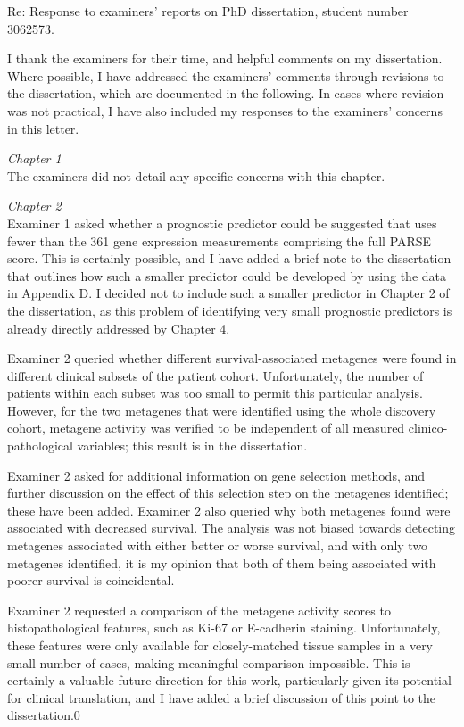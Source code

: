 \documentclass[a4paper,12pt,stdletter,sigleft]{newlfm}
\begin{document}
\begin{newlfm}

Re: Response to examiners' reports on PhD dissertation, student number 3062573.

I thank the examiners for their time, and helpful comments on my dissertation.  Where possible, I have addressed the examiners' comments through revisions to the dissertation, which are documented in the following.  In cases where revision was not practical, I have also included my responses to the examiners' concerns in this letter.

\emph{Chapter 1} \\
The examiners did not detail any specific concerns with this chapter.

\emph{Chapter 2} \\
Examiner 1 asked whether a prognostic predictor could be suggested that uses fewer than the 361 gene expression measurements comprising the full PARSE score.  This is certainly possible, and I have added a brief note to the dissertation that outlines how such a smaller predictor could be developed by using the data in Appendix D.  I decided not to include such a smaller predictor in Chapter 2 of the dissertation, as this problem of identifying very small prognostic predictors is already directly addressed by Chapter 4.

Examiner 2 queried whether different survival-associated metagenes were found in different clinical subsets of the patient cohort.  Unfortunately, the number of patients within each subset was too small to permit this particular analysis.  However, for the two metagenes that were identified using the whole discovery cohort, metagene activity was verified to be independent of all measured clinico-pathological variables; this result is in the dissertation.

Examiner 2 asked for additional information on gene selection methods, and further discussion on the effect of this selection step on the metagenes identified; these have been added.  Examiner 2 also queried why both metagenes found were associated with decreased survival.  The analysis was not biased towards detecting metagenes associated with either better or worse survival, and with only two metagenes identified, it is my opinion that both of them being associated with poorer survival is coincidental.

Examiner 2 requested a comparison of the metagene activity scores to histopathological features, such as Ki-67 or E-cadherin staining.  Unfortunately, these features were only available for closely-matched tissue samples in a very small number of cases, making meaningful comparison impossible.  This is certainly a valuable future direction for this work, particularly given its potential for clinical translation, and I have added a brief discussion of this point to the dissertation.0


\end{newlfm}
\end{document}
